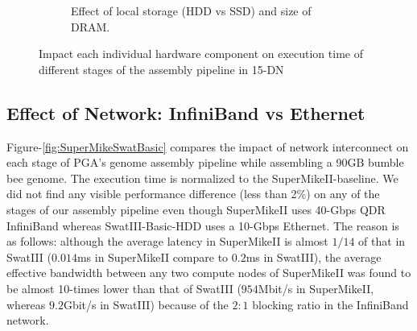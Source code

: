 \documentclass[conference]{IEEEtran}
\begin{document}
\begin{figure}[htb]
\begin{subfigure}[b]{0.23\textwidth}
                \caption{Effect of local storage (HDD vs SSD) and size of DRAM.}
                \label{fig:SuperMikeSwatStorageMemory}
   \end{subfigure}
   \caption{Impact each individual hardware component on execution time of different stages of the assembly pipeline in 15-DN }
  \label{fig:SuperMikeSwat}
  \vspace{-1.5em}
\end{figure}

\subsection {Effect of Network: InfiniBand vs Ethernet} \label{EffectOfNetwork}
Figure-\ref{fig:SuperMikeSwatBasic} compares the impact of network interconnect on each stage of PGA's genome assembly pipeline while assembling a 90GB bumble bee genome. The execution time is normalized to the SuperMikeII-baseline. We did not find any visible performance difference (less than 2\%) on any of the stages of our assembly pipeline even though SuperMikeII uses 40-Gbps QDR InfiniBand whereas SwatIII-Basic-HDD uses a 10-Gbps Ethernet. The reason is as follows: although the average latency in SuperMikeII is almost $1/14$ of that in SwatIII ($0.014$ms in SuperMikeII compare to $0.2$ms in SwatIII), the average effective bandwidth between any two compute nodes of SuperMikeII was found to be almost 10-times lower than that of SwatIII ($954$Mbit/s in SuperMikeII, whereas $9.2$Gbit/s in SwatIII) because of the $2:1$ blocking ratio in the InfiniBand network.  
\end{document}
